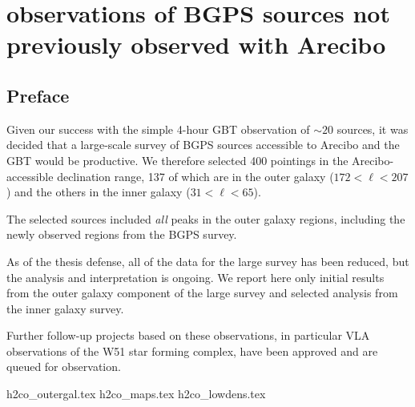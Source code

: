 
\chapter{\formaldehyde observations of BGPS sources not previously observed with Arecibo}
\label{ch:h2colarge}


\section{Preface} 

Given our success with the simple 4-hour GBT observation of $\sim20$ sources,
it was decided that a large-scale survey of BGPS sources accessible to Arecibo
and the GBT would be productive.  We therefore selected 400 pointings in the
Arecibo-accessible declination range, 137 of which are in the outer galaxy
($172<\ell<207$) and the others in the inner galaxy ($31<\ell<65$).

The selected sources included \emph{all} peaks in the outer galaxy regions,
including the newly observed regions from the BGPS \vtwo survey.

As of the thesis defense, all of the data for the large survey has been reduced,
but the analysis and interpretation is ongoing.  We report here only initial
results from the outer galaxy component of the large survey and selected analysis
from the inner galaxy survey.

Further follow-up projects based on these observations, in particular VLA
observations of the W51 star forming complex, have been approved and are
queued for observation.


{h2co_outergal.tex}
{h2co_maps.tex}
{h2co_lowdens.tex}



